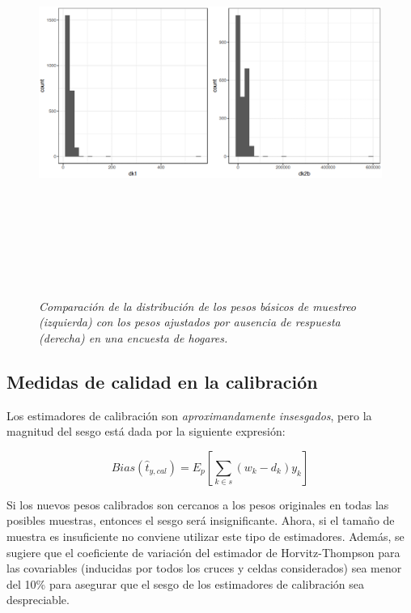 \documentclass[
  10pt,
  spanish,
]{book}
\begin{document}
\begin{figure}
\centering
\includegraphics[width=\textwidth,height=5.20833in]{Pics/17.png}
\caption{\emph{Comparación de la distribución de los pesos básicos de muestreo (izquierda) con los pesos ajustados por ausencia de respuesta (derecha) en una encuesta de hogares.}}
\end{figure}

\hypertarget{medidas-de-calidad-en-la-calibraciuxf3n}{%
\subsection{Medidas de calidad en la calibración}\label{medidas-de-calidad-en-la-calibraciuxf3n}}

Los estimadores de calibración son \emph{aproximandamente insesgados}, pero la magnitud del sesgo está dada por la siguiente expresión:

\[
Bias(\hat{t}_{y, cal}) = E_p \left[ \sum_{k \in s} (w_k - d_k) y_k \right]
\]

Si los nuevos pesos calibrados son cercanos a los pesos originales en todas las posibles muestras, entonces el sesgo será insignificante. Ahora, si el tamaño de muestra es insuficiente no conviene utilizar este tipo de estimadores. Además, se sugiere que el coeficiente de variación del estimador de Horvitz-Thompson para las covariables (inducidas por todos los cruces y celdas considerados) sea menor del 10\% para asegurar que el sesgo de los estimadores de calibración sea despreciable.
\end{document}
